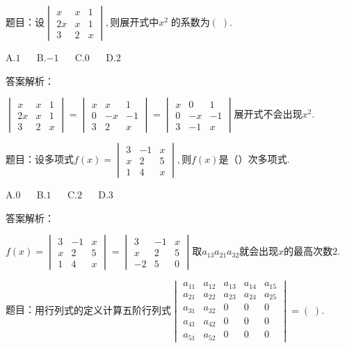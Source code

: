 题目：$设\begin{vmatrix}x&x&1\\2x&x&1\\3&2&x\end{vmatrix},\mathrm{则展开式中}x^2\;\mathrm{的系数为}(\;).$

A.$1$ $\quad$ B.$-1$ $\quad$ C.$0$ $\quad$ D.$2$

答案解析：

$\begin{vmatrix}x&x&1\\2x&x&1\\3&2&x\end{vmatrix}=\begin{vmatrix}x&x&1\\0&-x&-1\\3&2&x\end{vmatrix}=\begin{vmatrix}x&0&1\\0&-x&-1\\3&-1&x\end{vmatrix}\mathrm{展开式不会出现}x^2.$



题目：$\mathrm{设多项式}f(x)=\begin{vmatrix}3&-1&x\\x&2&5\\1&4&x\end{vmatrix},则f(x)是（）\mathrm{次多项式}.$

A.$0$ $\quad$ B.$1$ $\quad$ C.$2$ $\quad$ D.$3$

答案解析：

$f(x)=\begin{vmatrix}3&-1&x\\x&2&5\\1&4&x\end{vmatrix}=\begin{vmatrix}3&-1&x\\x&2&5\\-2&5&0\end{vmatrix}取a_{13}a_{21}a_{32}\mathrm{就会出现}x\mathrm{的最高次数}2.$



题目：$\mathrm{用行列式的定义计算五阶行列式}\begin{vmatrix}a_{11}&a_{12}&a_{13}&a_{14}&a_{15}\\a_{21}&a_{22}&a_{23}&a_{24}&a_{25}\\a_{31}&a_{32}&0&0&0\\a_{41}&a_{42}&0&0&0\\a_{51}&a_{52}&0&0&0\end{vmatrix}=(\;).$

